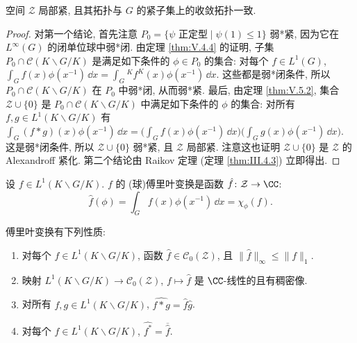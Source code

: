 \begin{proposition}
\label{prop:V.6.3}
空间 $\mathcal{Z}$ 局部紧, 且其拓扑与 $G$ 的紧子集上的收敛拓扑一致.
\end{proposition}

\begin{proof}
对第一个结论, 首先注意 $P_0 = \{\psi \text{ 正定型} \mid \psi(1) \leq 1\}$ 弱*紧, 因为它在 $L^{\infty}(G)$ 的闭单位球中弱*闭. 由定理 \ref{thm:V.4.4} 的证明, 子集 $P_0 \cap \mathcal{C}(K\backslash G/K)$ 是满足如下条件的 $\phi \in P_0$ 的集合: 对每个 $f \in L^1(G)$, $\int_G f(x)\phi(x^{-1})\,\dd x = \int_G {}^Kf^K(x)\phi(x^{-1})\,\dd x$. 这些都是弱*闭条件, 所以 $P_0 \cap \mathcal{C}(K\backslash G/K)$ 在 $P_0$ 中弱*闭, 从而弱*紧. 最后, 由定理 \ref{thm:V.5.2}, 集合 $\mathcal{Z} \cup \{0\}$ 是 $P_0 \cap \mathcal{C}(K\backslash G/K)$ 中满足如下条件的 $\phi$ 的集合: 对所有 $f, g \in L^1(K\backslash G/K)$ 有 $\int_G (f * g)(x)\phi(x^{-1})\,\dd x = \bigl(\int_G f(x)\phi(x^{-1})\,\dd x\bigr)\bigl(\int_G g(x)\phi(x^{-1})\,\dd x\bigr)$. 这是弱*闭条件, 所以 $\mathcal{Z} \cup \{0\}$ 弱*紧, 且 $\mathcal{Z}$ 局部紧. 注意这也证明 $\mathcal{Z} \cup \{0\}$ 是 $\mathcal{Z}$ 的 Alexandroff 紧化.
第二个结论由 Raikov 定理 (定理 \ref{thm:III.4.3}) 立即得出.
\end{proof}

\begin{definition}
\label{def:V.6.4}
设 $f \in L^1(K\backslash G/K)$. $f$ 的 (球)傅里叶变换是函数 $\hat{f} \colon \mathcal{Z} \to \CC$:
\[
\hat{f}(\phi) = \int_G f(x)\phi(x^{-1})\,\dd x = \chi_{\phi}(f).
\]
\end{definition}

\begin{proposition}[傅里叶变换的性质]
\label{prop:V.6.5}
傅里叶变换有下列性质:
\begin{enumerate}
\item[(i)] 对每个 $f \in L^1(K\backslash G/K)$, 函数 $\hat{f} \in \mathcal{C}_0(\mathcal{Z})$, 且 $\|\hat{f}\|_{\infty} \leq \|f\|_1$.
\item[(ii)] 映射 $L^1(K\backslash G/K) \to \mathcal{C}_0(\mathcal{Z})$, $f \longmapsto \hat{f}$ 是 $\CC$-线性的且有稠密像.
\item[(iii)] 对所有 $f, g \in L^1(K\backslash G/K)$, $\widehat{f * g} = \hat{f}\hat{g}$.
\item[(iv)] 对每个 $f \in L^1(K\backslash G/K)$, $\widehat{f^*} = \overline{\hat{f}}$.
\end{enumerate}
\end{proposition}

